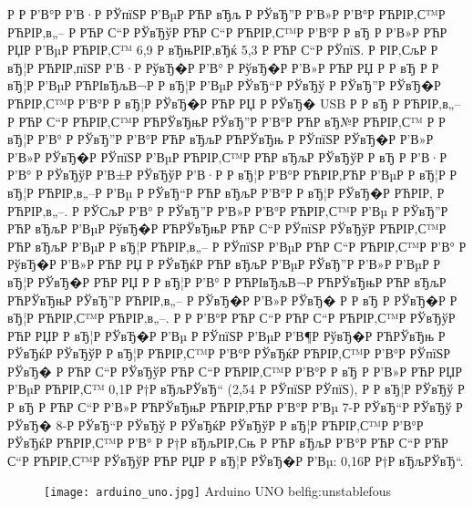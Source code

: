 \documentclass[a4paper,14pt]{extarticle}
\begin{document}
Р   Р  Р’В°Р  Р’В·Р  РЎпїЅР  Р’ВµР РЋР вЂљ Р  РЎвЂ”Р  Р’В»Р  Р’В°Р РЋРІР‚С™Р РЋРІР‚в„– Р РЋР С“Р  РЎвЂўР РЋР С“Р РЋРІР‚С™Р  Р’В°Р  Р вЂ Р  Р’В»Р РЋР РЏР  Р’ВµР РЋРІР‚С™ 6,9 Р вЂњРІР‚вЂќ 5,3 Р РЋР С“Р  РЎпїЅ. Р  РІР‚СљР  Р вЂ¦Р РЋРІР‚пїЅР  Р’В·Р  РўвЂ�Р  Р’В° Р  РўвЂ�Р  Р’В»Р РЋР РЏ Р  Р вЂ Р  Р вЂ¦Р  Р’ВµР РЋРІвЂљВ¬Р  Р вЂ¦Р  Р’ВµР  РЎвЂ“Р  РЎвЂў Р  РЎвЂ”Р  РЎвЂ�Р РЋРІР‚С™Р  Р’В°Р  Р вЂ¦Р  РЎвЂ�Р РЋР РЏ Р  РЎвЂ� USB Р  Р вЂ Р РЋРІР‚в„–Р РЋР С“Р РЋРІР‚С™Р РЋРЎвЂњР  РЎвЂ”Р  Р’В°Р РЋР вЂ№Р РЋРІР‚С™ Р  Р вЂ¦Р  Р’В° Р  РЎвЂ”Р  Р’В°Р РЋР вЂљР РЋРЎвЂњ Р  РЎпїЅР  РЎвЂ�Р  Р’В»Р  Р’В»Р  РЎвЂ�Р  РЎпїЅР  Р’ВµР РЋРІР‚С™Р РЋР вЂљР  РЎвЂўР  Р вЂ  Р  Р’В·Р  Р’В° Р  РЎвЂўР  Р’В±Р  РЎвЂўР  Р’В·Р  Р вЂ¦Р  Р’В°Р РЋРІР‚РЋР  Р’ВµР  Р вЂ¦Р  Р вЂ¦Р РЋРІР‚в„–Р  Р’Вµ Р  РЎвЂ“Р РЋР вЂљР  Р’В°Р  Р вЂ¦Р  РЎвЂ�Р РЋРІР‚ Р РЋРІР‚в„–. Р  РЎСљР  Р’В° Р  РЎвЂ”Р  Р’В»Р  Р’В°Р РЋРІР‚С™Р  Р’Вµ Р  РЎвЂ”Р РЋР вЂљР  Р’ВµР  РўвЂ�Р РЋРЎвЂњР РЋР С“Р  РЎпїЅР  РЎвЂўР РЋРІР‚С™Р РЋР вЂљР  Р’ВµР  Р вЂ¦Р РЋРІР‚в„– Р  РЎпїЅР  Р’ВµР РЋР С“Р РЋРІР‚С™Р  Р’В° Р  РўвЂ�Р  Р’В»Р РЋР РЏ Р  РЎвЂќР РЋР вЂљР  Р’ВµР  РЎвЂ”Р  Р’В»Р  Р’ВµР  Р вЂ¦Р  РЎвЂ�Р РЋР РЏ Р  Р вЂ¦Р  Р’В° Р РЋРІвЂљВ¬Р РЋРЎвЂњР РЋР вЂљР РЋРЎвЂњР  РЎвЂ”Р РЋРІР‚в„– Р  РЎвЂ�Р  Р’В»Р  РЎвЂ� Р  Р вЂ Р  РЎвЂ�Р  Р вЂ¦Р РЋРІР‚С™Р РЋРІР‚в„–. Р   Р  Р’В°Р РЋР С“Р РЋР С“Р РЋРІР‚С™Р  РЎвЂўР РЋР РЏР  Р вЂ¦Р  РЎвЂ�Р  Р’Вµ Р  РЎпїЅР  Р’ВµР  Р’В¶Р  РўвЂ�Р РЋРЎвЂњ Р  РЎвЂќР  РЎвЂўР  Р вЂ¦Р РЋРІР‚С™Р  Р’В°Р  РЎвЂќР РЋРІР‚С™Р  Р’В°Р  РЎпїЅР  РЎвЂ� Р РЋР С“Р  РЎвЂўР РЋР С“Р РЋРІР‚С™Р  Р’В°Р  Р вЂ Р  Р’В»Р РЋР РЏР  Р’ВµР РЋРІР‚С™ 0,1Р Р†Р вЂљРЎвЂ“ (2,54 Р  РЎпїЅР  РЎпїЅ), Р  Р вЂ¦Р  РЎвЂў Р  Р вЂ  Р РЋР С“Р  Р’В»Р РЋРЎвЂњР РЋРІР‚РЋР  Р’В°Р  Р’Вµ 7-Р  РЎвЂ“Р  РЎвЂў Р  РЎвЂ� 8-Р  РЎвЂ“Р  РЎвЂў Р  РЎвЂќР  РЎвЂўР  Р вЂ¦Р РЋРІР‚С™Р  Р’В°Р  РЎвЂќР РЋРІР‚С™Р  Р’В° Р Р†Р вЂљРІР‚Сњ Р РЋР вЂљР  Р’В°Р РЋР С“Р РЋР С“Р РЋРІР‚С™Р  РЎвЂўР РЋР РЏР  Р вЂ¦Р  РЎвЂ�Р  Р’Вµ: 0,16Р Р†Р вЂљРЎвЂ“.
\begin{figure}[H]
  \texttt{[image: arduino\_uno.jpg]}
  {Arduino UNO}
\label{graph_fragment}bel{fig:unstablefous}
\end{figure}

\clearpage
\end{document}
